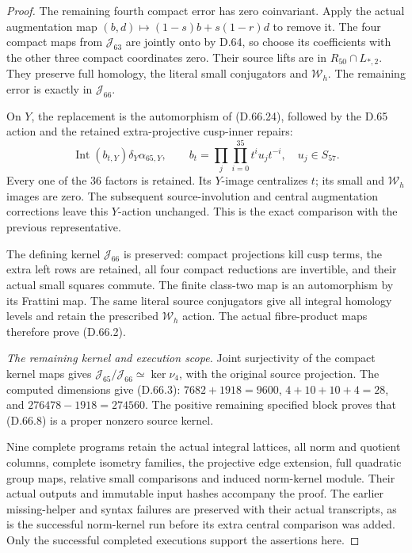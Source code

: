 \begin{proof}
The remaining fourth compact error has
zero coinvariant. Apply the actual
augmentation map
\((b,d)\mapsto(1-s)b+s(1-r)d\) to
remove it. The four compact maps from
\(\mathcal J_{63}\) are jointly onto
by D.64, so choose its coefficients
with the other three compact coordinates
zero. Their source lifts are in
\(R_{50}\cap L_{*,2}\). They preserve
full homology, the literal small
conjugators and \(\mathcal W_h\).
The remaining error is exactly in
\(\mathcal J_{66}\).

On \(Y\), the replacement is the
automorphism of (D.66.24), followed
by the D.65 action and the retained
extra-projective cusp-inner repairs:
\[
 \operatorname{Int}(b_{t,Y})\delta_Y\alpha_{65,Y},
 \qquad
 b_t=\prod_j\prod_{i=0}^{35}t^iu_jt^{-i},
 \quad u_j\in S_{57}.
 \tag{D.66.27}
\]
Every one of the 36 factors is retained.
Its \(Y\)-image centralizes \(t\);
its small and \(\mathcal W_h\) images
are zero. The subsequent source-involution
and central augmentation corrections
leave this \(Y\)-action unchanged.
This is the exact comparison with
the previous representative.

The defining kernel \(\mathcal J_{66}\)
is preserved: compact projections kill
cusp terms, the extra left rows are
retained, all four compact reductions
are invertible, and their actual small
squares commute. The finite class-two
map is an automorphism by its Frattini
map. The same literal source conjugators
give all integral homology levels and
retain the prescribed \(\mathcal W_h\)
action. The actual fibre-product maps
therefore prove (D.66.2).

\emph{The remaining kernel and execution scope.}
Joint surjectivity of the compact
kernel maps gives
\(\mathcal J_{65}/\mathcal J_{66}
 \simeq\ker\nu_4\), with the original
source projection. The computed
dimensions give (D.66.3):
\(7682+1918=9600\),
\(4+10+10+4=28\), and
\(276478-1918=274560\).
The positive remaining specified
block proves that (D.66.8) is a
proper nonzero source kernel.

Nine complete programs retain the
actual integral lattices, all norm
and quotient columns, complete
isometry families, the projective
edge extension, full quadratic group
maps, relative small comparisons
and induced norm-kernel module.
Their actual outputs and immutable
input hashes accompany the proof.
The earlier missing-helper and
syntax failures are preserved with
their actual transcripts, as is the
successful norm-kernel run before
its extra central comparison was
added. Only the successful completed
executions support the assertions here.
\end{proof}

